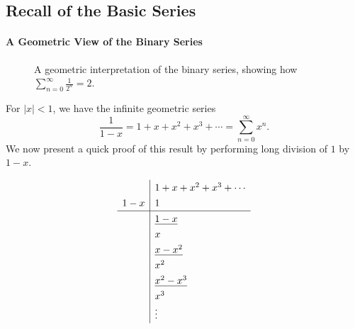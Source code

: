 \documentclass{article}
\begin{document}
\subsection*{Recall of the Basic Series}
\paragraph{A Geometric View of the Binary Series}
\begin{figure}[ht]
  \centering
\caption{A geometric interpretation of the binary series, showing how 
\(\sum_{n=0}^{\infty} \tfrac{1}{2^n} = 2\).}
\end{figure}
For \(|x| < 1\), we have the infinite geometric series
\[
\frac{1}{1-x} = 1 + x + x^2 + x^3 + \cdots = \sum_{n=0}^{\infty} x^n.
\]
We now present a quick proof of this result by performing long division of \(1\) by \(1-x\).

\[
\renewcommand{\arraystretch}{1.3}
\begin{array}{r|l}
 & 1 + x + x^2 + x^3 + \cdots \\ %
1 - x & 1  \\ %
\hline
 & \underline{1 - x} \\
 & x \\
 & \underline{x - x^2} \\
 & x^2 \\
 & \underline{x^2 - x^3} \\
 & x^3 \\
 & \vdots
\end{array}
\]
\end{document}
